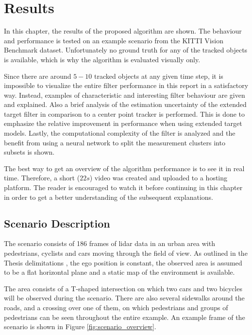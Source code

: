 \chapter{Results}

In this chapter, the results of the proposed algorithm are shown. The behaviour and performance is tested on an example scenario from the KITTI Vision Benchmark dataset. \cite{Geiger2013IJRR} Unfortunately no ground truth for any of the tracked objects is available, which is why the algorithm is evaluated visually only.

Since there are around $5-10$ tracked objects at any given time step, it is impossible to visualize the entire filter performance in this report in a satisfactory way. Instead, examples of characteristic and interesting filter behaviour are given and explained. Also a brief analysis of the estimation uncertainty of the extended target filter in comparison to a center point tracker is performed. This is done to emphasize the relative improvement in performance when using extended target models. Lastly, the computational complexity of the filter is analyzed and the benefit from using a neural network to split the measurement clusters into subsets is shown.

The best way to get an overview of the algorithm performance is to see it in real time. Therefore, a short ($22s$) video was created and uploaded to a hosting platform. The reader is encouraged to watch it before continuing in this chapter in order to get a better understanding of the subsequent explanations. 

\section{Scenario Description}
The scenario consists of 186 frames of lidar data in an urban area with pedestrians, cyclists and cars moving through the field of view. As outlined in the Thesis delimitations , the ego position is constant, the observed area is assumed to be a flat horizontal plane and a static map of the environment is available.

The area consists of a T-shaped intersection on which two cars and two bicycles will be observed during the scenario. There are also several sidewalks around the roads, and a crossing over one of them, on which pedestrians and groups of pedestrians can be seen throughout the entire example. An example frame of the scenario is shown in Figure \ref{fig:scenario_overview}.

